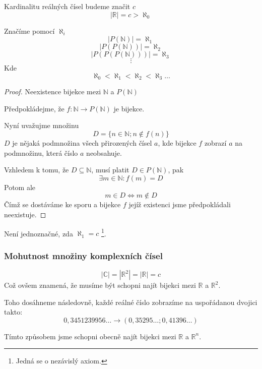 Kardinalitu reálných čísel budeme značit $c$
$$|\mathbb{R}| = c > \aleph_0$$

\begin{definition}
    Značíme pomocí $\aleph_i$
    $$|P(\mathbb{N})| = \aleph_1$$
    $$|P(P(\mathbb{N}))| = \aleph_2$$
    $$|P(P(P(\mathbb{N})))| = \aleph_3$$
    $$\vdots$$
    Kde
    $$\aleph_0 < \aleph_1 < \aleph_2 < \aleph_3 \ldots$$
\end{definition}

\begin{proof}
    Neexistence bijekce mezi $\mathbb{N}$ a $P(\mathbb{N})$

    Předpokládejme, že $f: \mathbb{N} \rightarrow P(\mathbb{N})$ je bijekce.

    Nyní uvažujme množinu
    $$D = \{n \in \mathbb{N}; n \notin f(n)\}$$
    $D$ je nějaká podmnožina všech přirozených čísel $a$, kde bijekce $f$ zobrazí $a$ na
    podmnožinu, která číslo $a$ neobsahuje.

    Vzhledem k tomu, že $D \subseteq \mathbb{N}$, musí platit $D \in P(\mathbb{N})$, pak
    $$\exists m \in \mathbb{N}: f(m) = D$$
    Potom ale $$m \in D \Leftrightarrow m \notin D$$
    Čímž se dostáváme ke sporu a bijekce $f$ jejíž existenci jsme předpokládali neexistuje.
\end{proof}

Není jednoznačné, zda $\aleph_1 = c$ \footnote{Jedná se o nezávislý axiom.}.

\subsubsection*{Mohutnost množiny komplexních čísel}
$$|\mathbb{C}| = |\mathbb{R}^2| = |\mathbb{R}| = c$$
Což ovšem znamená, že musíme být schopni najít bijekci mezi $\mathbb{R}$ a $\mathbb{R}^2$.

Toho dosáhneme následovně, každé reálné číslo zobrazíme na uspořádanou dvojici takto:
$$0,3451239956\ldots \rightarrow (0,35295\ldots ;0,41396\ldots)$$

Tímto způsobem jsme schopni obecně najít bijekci mezi $\mathbb{R}$ a $\mathbb{R}^n$.
